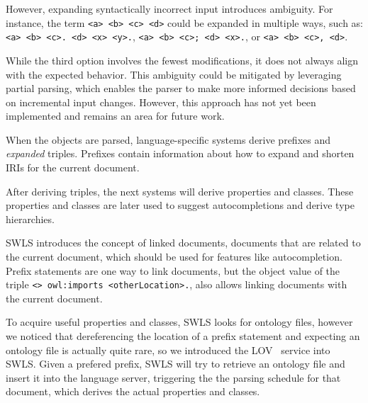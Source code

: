 However, expanding syntactically incorrect input introduces ambiguity.
For instance, the term \texttt{<a> <b> <c> <d>} could be expanded in multiple ways, such as: \texttt{<a> <b> <c>. <d> <x> <y>.}, \texttt{<a> <b> <c>; <d> <x>.}, or \texttt{<a> <b> <c>, <d>}.

While the third option involves the fewest modifications, it does not always align with the expected behavior.
This ambiguity could be mitigated by leveraging partial parsing, which enables the parser to make more informed decisions based on incremental input changes.
However, this approach has not yet been implemented and remains an area for future work.

When the objects are parsed, language-specific systems derive prefixes and \textit{expanded} triples. 
Prefixes contain information about how to expand and shorten IRIs for the current document.

After deriving triples, the next systems will derive properties and classes.
These properties and classes are later used to suggest autocompletions and derive type hierarchies.

SWLS introduces the concept of linked documents, documents that are related to the current document, which should be used for features like autocompletion.
Prefix statements are one way to link documents, but the object value of the triple \texttt{<> owl:imports <otherLocation>.}, also allows linking documents with the current document.

To acquire useful properties and classes, SWLS looks for ontology files, however we noticed that dereferencing the location of a prefix statement and expecting an ontology file is actually quite rare, 
so we introduced the LOV~\cite{LOV2017} service into SWLS.
Given a prefered prefix, SWLS will try to retrieve an ontology file and insert it into the language server, triggering the the parsing schedule for that document, which derives the actual properties and classes.

